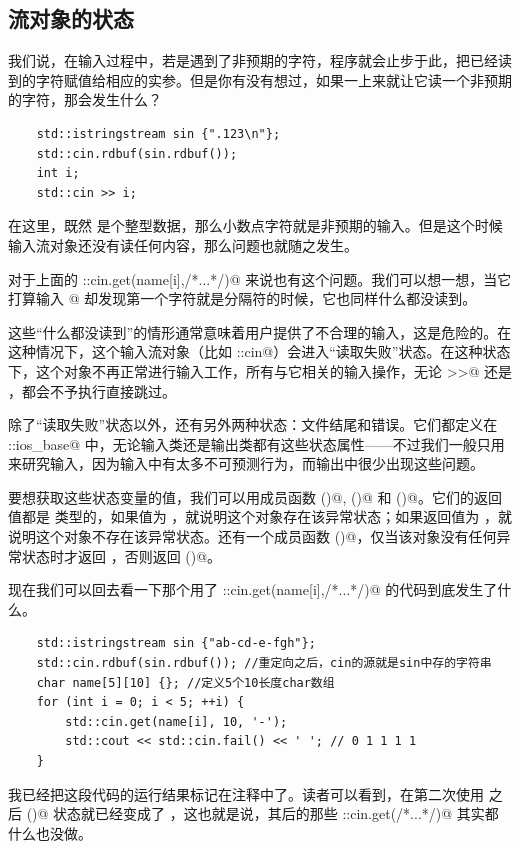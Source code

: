 \subsection*{流对象的状态}
我们说，在输入过程中，若是遇到了非预期的字符，程序就会止步于此，把已经读到的字符赋值给相应的实参。但是你有没有想过，如果一上来就让它读一个非预期的字符，那会发生什么？
\begin{lstlisting}
    std::istringstream sin {".123\n"};
    std::cin.rdbuf(sin.rdbuf());
    int i;
    std::cin >> i;
\end{lstlisting}
在这里，既然 \lstinline@i@ 是个整型数据，那么小数点字符就是非预期的输入。但是这个时候输入流对象还没有读任何内容，那么问题也就随之发生。\par
对于上面的 \lstinline@std::cin.get(name[i],/*...*/)@ 来说也有这个问题。我们可以想一想，当它打算输入 \lstinline@name[1]@ 却发现第一个字符就是分隔符的时候，它也同样什么都没读到。\par
这些``什么都没读到''的情形通常意味着用户提供了不合理的输入，这是危险的。在这种情况下，这个输入流对象（比如 \lstinline@std::cin@）会进入``读取失败''状态。在这种状态下，这个对象不再正常进行输入工作，所有与它相关的输入操作，无论 \lstinline@>>@ 还是 \lstinline@getline@，都会不予执行直接跳过。\par
除了``读取失败''状态以外，还有另外两种状态：文件结尾和错误。它们都定义在 \lstinline@std::ios_base@ 中，无论输入类还是输出类都有这些状态属性——不过我们一般只用来研究输入，因为输入中有太多不可预测行为，而输出中很少出现这些问题。\par
要想获取这些状态变量的值，我们可以用成员函数 \lstinline@fail()@, \lstinline@eof()@ 和 \lstinline@bad()@。它们的返回值都是 \lstinline@bool@ 类型的，如果值为 \lstinline@true@，就说明这个对象存在该异常状态；如果返回值为 \lstinline@bool@，就说明这个对象不存在该异常状态。还有一个成员函数 \lstinline@good()@，仅当该对象没有任何异常状态时才返回 \lstinline@true@，否则返回 \lstinline@false()@。\par
现在我们可以回去看一下那个用了 \lstinline@std::cin.get(name[i],/*...*/)@ 的代码到底发生了什么。
\begin{lstlisting}
    std::istringstream sin {"ab-cd-e-fgh"};
    std::cin.rdbuf(sin.rdbuf()); //重定向之后，cin的源就是sin中存的字符串
    char name[5][10] {}; //定义5个10长度char数组
    for (int i = 0; i < 5; ++i) {
        std::cin.get(name[i], 10, '-');
        std::cout << std::cin.fail() << ' '; // 0 1 1 1 1
    }
\end{lstlisting}
我已经把这段代码的运行结果标记在注释中了。读者可以看到，在第二次使用 \lstinline@get@ 之后 \lstinline@fail()@ 状态就已经变成了 \lstinline@true@，这也就是说，其后的那些 \lstinline@std::cin.get(/*...*/)@ 其实都什么也没做。\par
